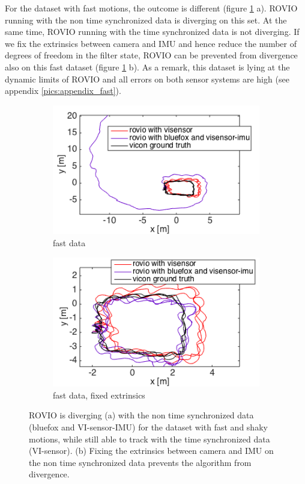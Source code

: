 For the dataset with fast motions, the outcome is different (figure \ref{pics:timesync_fast} a). ROVIO running with the non time synchronized data is diverging on this set. At the same time, ROVIO running with the time synchronized data is not diverging. If we fix the extrinsics between camera and IMU and hence reduce the number of degrees of freedom in the filter state, ROVIO can be prevented from divergence also on this fast dataset (figure \ref{pics:timesync_fast} b). As a remark, this dataset is lying at the dynamic limits of ROVIO and all errors on both sensor systems are high (see appendix \ref{pics:appendix_fast}). \\

\begin{figure}
  \begin{subfigure}[b]{0.48\textwidth}
    \captionsetup{skip=6pt}
    \includegraphics[width=\textwidth]{images/fast_2D.png}
    \caption{fast data}
  \end{subfigure}
  \hfill
  \begin{subfigure}[b]{0.48\textwidth}
    \captionsetup{skip=6pt}
    \includegraphics[width=\textwidth]{images/fast_fixed_2D.png}
    \caption{fast data, fixed extrinsics}
  \end{subfigure}
   \caption{ROVIO is diverging (a) with the non time synchronized data (bluefox and VI-sensor-IMU) for the dataset with fast and shaky motions, while still able to track with the time synchronized data (VI-sensor). (b) Fixing the extrinsics between camera and IMU on the non time synchronized data prevents the algorithm from divergence.}
   \label{pics:timesync_fast}
\end{figure}

